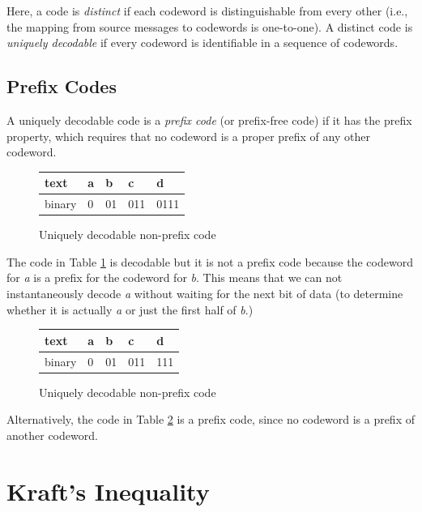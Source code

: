 \documentclass[11pt]{article}
\begin{document}
Here, a code is \textit{distinct} if each codeword is distinguishable from every other (i.e., the mapping from source messages to codewords is one-to-one). A distinct code is \textit{uniquely decodable} if every codeword is identifiable in a sequence of codewords. 

\subsection{Prefix Codes}
A uniquely decodable code is a \textit{prefix code} (or prefix-free code) if it has the prefix property, which requires that no codeword is a proper prefix of any other codeword.

\begin{figure}[h!]
\begin{center}
\begin{tabular}{| l | l | l | l | l |}
 \hline
  text   & a & b & c & d \\ \hline
  binary & 0 & 01 & 011 & 0111 \\ 
  \hline
\end{tabular}
\caption{Uniquely decodable non-prefix code}
\label{table:non_prefix_code}
\end{center}
\end{figure}

The code in Table \ref{table:non_prefix_code} is decodable but it is not a prefix code because the codeword for \textit{a} is a prefix for the codeword for \textit{b}. This means that we can not instantaneously decode \textit{a} without waiting for the next bit of data (to determine whether it is actually \textit{a} or just the first half of \textit{b}.)

\begin{figure}[h!]
\begin{center}
\begin{tabular}{| l | l | l | l | l |}
 \hline
  text   & a & b & c & d \\ \hline
  binary & 0 & 01 & 011 & 111 \\ 
  \hline
\end{tabular}
\caption{Uniquely decodable non-prefix code}
\label{table:prefix_code}
\end{center}
\end{figure}

Alternatively, the code in Table \ref{table:prefix_code} is a prefix code, since no codeword is a prefix of  another codeword.

\section{Kraft's Inequality}
\end{document}
